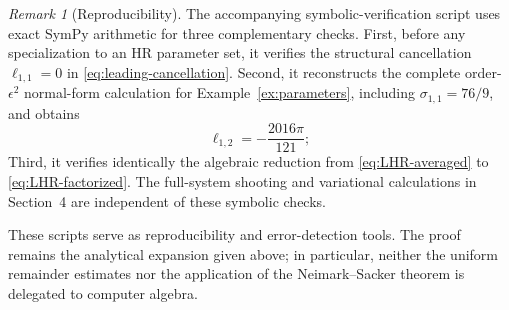 \documentclass[11pt]{amsart}
\theoremstyle{remark}
\newtheorem{remark}[theorem]{Remark}
\begin{document}
\begin{remark}[Reproducibility]\label{rem:reproducibility}
The accompanying symbolic-verification script uses exact SymPy arithmetic
for three complementary checks.  First, before any specialization to an HR
parameter set, it verifies the structural cancellation
\(\ell_{1,1}=0\) in \eqref{eq:leading-cancellation}.  Second, it reconstructs
the complete order-\(\epsilon^2\) normal-form calculation for
Example~\ref{ex:parameters}, including
\(\sigma_{1,1}=76/9\), and obtains
\[
 \ell_{1,2}=-\frac{2016\pi}{121};
\]
Third, it verifies identically the algebraic reduction from
\eqref{eq:LHR-averaged} to \eqref{eq:LHR-factorized}.  The full-system
shooting and variational calculations in Section~4 are independent of these
symbolic checks.

These scripts serve as reproducibility and error-detection tools.  The proof
remains the analytical expansion given above; in particular, neither the
uniform remainder estimates nor the application of the
Neimark--Sacker theorem is delegated to computer algebra.
\end{remark}



\end{document}
